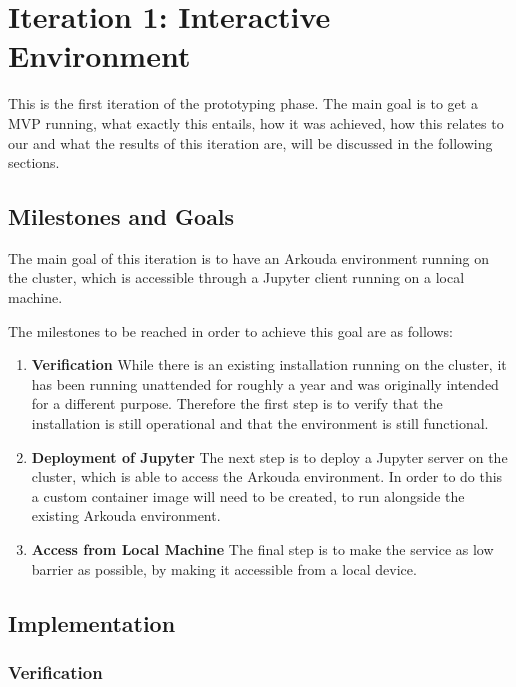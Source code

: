 
\section{Iteration 1: Interactive Environment}
\label{sec:iteration_no1}

This is the first iteration of the prototyping phase.
The main goal is to get a \ac{MVP} running, what exactly this entails,
how it was achieved, how this relates to our 
and what the results of this iteration are, will be discussed in the following sections.


\subsection{Milestones and Goals}

The main goal of this iteration is to have an Arkouda environment running on the cluster,
which is accessible through a Jupyter client running on a local machine.

The milestones to be reached in order to achieve this goal are as follows:

\begin{enumerate}
    \item \textbf{Verification} While there is an existing installation running on the cluster,
          it has been running unattended for roughly a year and was originally intended for a different purpose.
          Therefore the first step is to verify that the installation is still operational and that the environment is still functional.
    \item \textbf{Deployment of Jupyter} The next step is to deploy a Jupyter server on the cluster,
          which is able to access the Arkouda environment. In order to do this a custom container
          image will need to be created, to run alongside the existing Arkouda environment.
    \item \textbf{Access from Local Machine} The final step is to make the service as low barrier as possible,
          by making it accessible from a local device.

\end{enumerate}

\subsection{Implementation}

\subsubsection{Verification}

